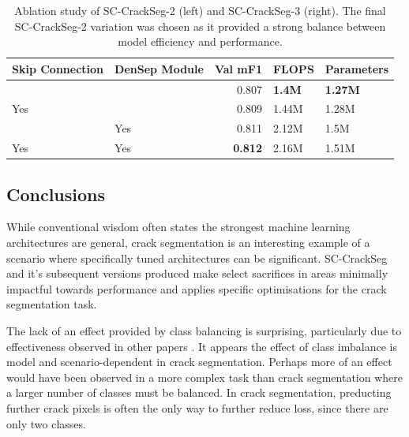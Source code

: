 \documentclass[a4paper,12pt]{report}
\begin{document}
\begin{table}[]
{        \quad

        \begin{tabular}{|l|l|r|l|l|}
            \hline
            \textbf{Skip Connection} & \textbf{DenSep Module} & \multicolumn{1}{l|}{\textbf{Val mF1}} & \textbf{FLOPS} & \textbf{Parameters} \\ \hline
                                     &                        & 0.807                                 & \textbf{1.4M}  & \textbf{1.27M}      \\ \hline
            Yes                      &                        & 0.809                                 & 1.44M          & 1.28M               \\ \hline
                                     & Yes                    & 0.811                                 & 2.12M          & 1.5M                \\ \hline
            Yes                      & Yes                    & \textbf{0.812}                        & 2.16M          & 1.51M               \\ \hline
        \end{tabular}
    }
    \caption{Ablation study of SC-CrackSeg-2 (left) and SC-CrackSeg-3 (right). The final SC-CrackSeg-2 variation was chosen as it provided a strong balance between model efficiency and performance.}
    \label{cap:sc-crackseg-ablation}
\end{table}

\subsection*{Conclusions}



While conventional wisdom often states the strongest machine learning architectures are general, crack segmentation is an interesting example of a scenario where specifically tuned architectures can be significant. SC-CrackSeg and it's subsequent versions produced make select sacrifices in areas minimally impactful towards performance and applies specific optimisations for the crack segmentation task.

The lack of an effect provided by class balancing is surprising, particularly due to effectiveness observed in other papers \cite{liu_deepcrack_2019}. It appears the effect of class imbalance is model and scenario-dependent in crack segmentation. Perhaps more of an effect would have been observed in a more complex task than crack segmentation where a larger number of classes must be balanced. In crack segmentation, preducting further crack pixels is often the only way to further reduce loss, since there are only two classes.
\end{document}

